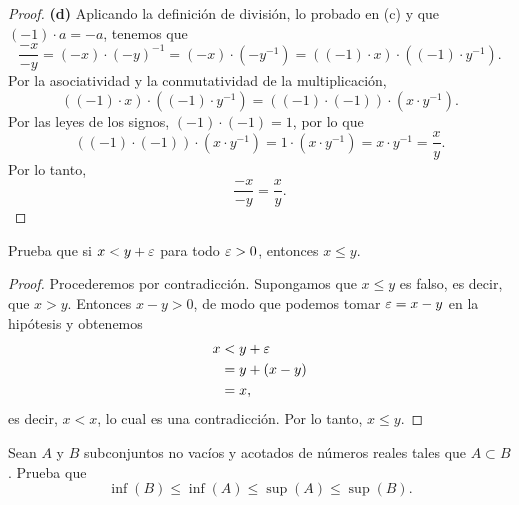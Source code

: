\documentclass[12pt,a4paper]{article}
\begin{document}
\begin{proof}
        \textbf{(d)} Aplicando la definición de división, lo probado en (c) y que $(-1)\cdot a=-a$, tenemos que
        \begin{equation*}
            \frac{-x}{-y}=(-x)\cdot(-y)^{-1}=(-x)\cdot(-y^{-1})=((-1)\cdot x)\cdot((-1)\cdot y^{-1}).
        \end{equation*}
        Por la asociatividad y la conmutatividad de la multiplicación,
        \begin{equation*}
            ((-1)\cdot x)\cdot((-1)\cdot y^{-1})=((-1)\cdot(-1))\cdot(x\cdot y^{-1}).
        \end{equation*}
        Por las leyes de los signos, $(-1)\cdot(-1)=1$, por lo que
        \begin{equation*}
            ((-1)\cdot(-1))\cdot(x\cdot y^{-1})=1\cdot(x\cdot y^{-1})=x\cdot y^{-1}=\frac{x}{y}.
        \end{equation*}
        Por lo tanto,
        \begin{equation*}
            \frac{-x}{-y}=\frac{x}{y}.
        \end{equation*}
    \end{proof}

    \begin{problema}
        Prueba que si $x<y+\varepsilon$ para todo $\varepsilon>0$, entonces $x\leq y$.
    \end{problema}

    \begin{proof}
        Procederemos por contradicción. Supongamos que $x\leq y$ es falso, es decir, que $x>y$. Entonces $x-y>0$, de modo que podemos tomar $\varepsilon=x-y$ en la hipótesis y obtenemos
        \begin{align*}
            x&<y+\varepsilon\\
            &=y+(x-y)\\
            &=x,
        \end{align*}
        es decir, $x<x$, lo cual es una contradicción. Por lo tanto, $x\leq y$.
    \end{proof}

    \begin{problema}
        Sean $A$ y $B$ subconjuntos no vacíos y acotados de números reales tales que $A\subset B$. Prueba que
        \begin{equation*}
            \inf(B)\leq\inf(A)\leq\sup(A)\leq\sup(B).
        \end{equation*}
    \end{problema}
\end{document}
